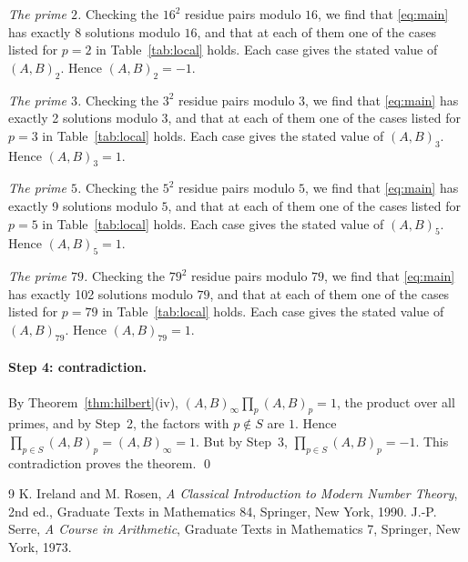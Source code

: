 \documentclass[11pt]{article}
\begin{document}
\emph{The prime $2$.} Checking the $16^2$ residue pairs modulo $16$, we find that \eqref{eq:main} has exactly 8 solutions modulo $16$, and that at each of them one of the cases listed for $p=2$ in Table~\ref{tab:local} holds. Each case gives the stated value of $(A,B)_{2}$. Hence $(A,B)_{2}=-1$.

\emph{The prime $3$.} Checking the $3^2$ residue pairs modulo $3$, we find that \eqref{eq:main} has exactly 2 solutions modulo $3$, and that at each of them one of the cases listed for $p=3$ in Table~\ref{tab:local} holds. Each case gives the stated value of $(A,B)_{3}$. Hence $(A,B)_{3}=1$.

\emph{The prime $5$.} Checking the $5^2$ residue pairs modulo $5$, we find that \eqref{eq:main} has exactly 9 solutions modulo $5$, and that at each of them one of the cases listed for $p=5$ in Table~\ref{tab:local} holds. Each case gives the stated value of $(A,B)_{5}$. Hence $(A,B)_{5}=1$.

\emph{The prime $79$.} Checking the $79^2$ residue pairs modulo $79$, we find that \eqref{eq:main} has exactly 102 solutions modulo $79$, and that at each of them one of the cases listed for $p=79$ in Table~\ref{tab:local} holds. Each case gives the stated value of $(A,B)_{79}$. Hence $(A,B)_{79}=1$.

\paragraph{Step 4: contradiction.} By Theorem~\ref{thm:hilbert}(iv), $(A,B)_\infty\prod_p(A,B)_p=1$, the product over all primes, and by Step~2, the factors with $p\notin S$ are $1$. Hence $\prod_{p\in S}(A,B)_p=(A,B)_\infty=1$. But by Step~3, $\prod_{p\in S}(A,B)_p=-1$. This contradiction proves the theorem.
\qed

\begin{thebibliography}{9}
 K. Ireland and M. Rosen, \emph{A Classical Introduction to Modern Number Theory}, 2nd ed., Graduate Texts in Mathematics 84, Springer, New York, 1990.
 J.-P. Serre, \emph{A Course in Arithmetic}, Graduate Texts in Mathematics 7, Springer, New York, 1973.
\end{thebibliography}
\end{document}
